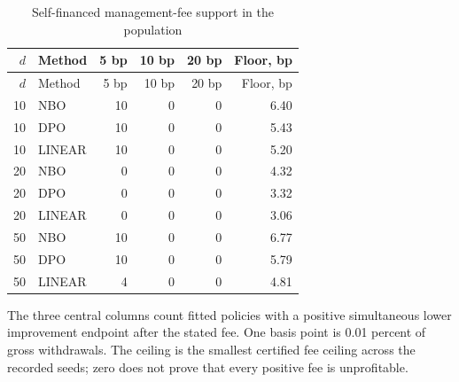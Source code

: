 \begingroup\small\setlength{\tabcolsep}{4pt}
\begin{longtable}{rlrrrr}
\caption{Self-financed management-fee support in the population}\label{tab:r12fee}\\
\toprule
$d$ & Method & 5 bp & 10 bp & 20 bp & Floor, bp\\\midrule
\endfirsthead
\toprule
$d$ & Method & 5 bp & 10 bp & 20 bp & Floor, bp\\\midrule
\endhead
10 & NBO & 10 & 0 & 0 & 6.40\\
10 & DPO & 10 & 0 & 0 & 5.43\\
10 & LINEAR & 10 & 0 & 0 & 5.20\\
20 & NBO & 0 & 0 & 0 & 4.32\\
20 & DPO & 0 & 0 & 0 & 3.32\\
20 & LINEAR & 0 & 0 & 0 & 3.06\\
50 & NBO & 10 & 0 & 0 & 6.77\\
50 & DPO & 10 & 0 & 0 & 5.79\\
50 & LINEAR & 4 & 0 & 0 & 4.81\\
\bottomrule\end{longtable}
\noindent The three central columns count fitted policies with a positive simultaneous lower improvement endpoint after the stated fee. One basis point is 0.01 percent of gross withdrawals. The ceiling is the smallest certified fee ceiling across the recorded seeds; zero does not prove that every positive fee is unprofitable.
\endgroup
